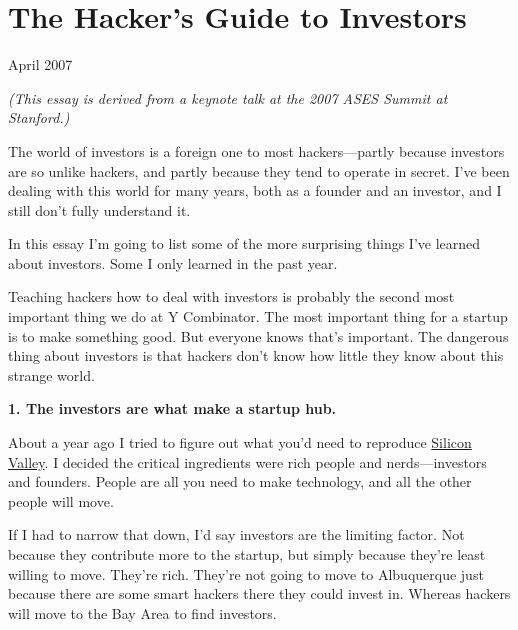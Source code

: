 \chapter{The Hacker's Guide to Investors}


            
              
                

April 2007

\emph{(This essay is derived from a keynote talk at the 2007 ASES
                    Summit at Stanford.)}

The world of investors is a foreign one to most
                  hackers---partly because investors are so unlike hackers,
                  and partly because they tend to operate in secret. I've been
                  dealing with this world for many years, both as a founder and
                  an investor, and I still don't fully understand it.

In
                  this essay I'm going to list some of the more surprising
                  things I've learned about investors. Some I only learned in
                  the past year.

Teaching hackers how to deal with
                  investors is probably the second most important thing we do at
                  Y Combinator. The most important thing for a startup is to
                  make something good. But everyone knows that's important. The
                  dangerous thing about investors is that hackers don't know how
                  little they know about this strange world.

\textbf{1. The investors are what make a startup hub.}

About a year ago I tried to figure out what you'd
                  need to reproduce
                  \href{http://www.paulgraham.com/siliconvalley.html}{Silicon Valley}. I decided the
                  critical ingredients were rich people and
                  nerds---investors and founders. People are all you need to
                  make technology, and all the other people will move.

If
                  I had to narrow that down, I'd say investors are the limiting
                  factor. Not because they contribute more to the startup, but
                  simply because they're least willing to move. They're rich.
                  They're not going to move to Albuquerque just because there
                  are some smart hackers there they could invest in. Whereas
                  hackers will move to the Bay Area to find investors.

